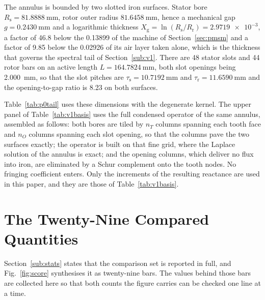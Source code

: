 \documentclass[10pt,a4paper,twocolumn]{article}
\newcommand{\Rs}{R_{\mathrm{s}}}
\newcommand{\Xg}{X_{\mathrm{g}}}
\theoremstyle{plain}
\theoremstyle{remark}
\begin{document}
The annulus is bounded by two slotted iron surfaces. Stator bore
$\Rs=\SI{81.8888}{\milli\metre}$, rotor outer radius
$\SI{81.6458}{\milli\metre}$, hence a mechanical gap
$g=\SI{0.2430}{\milli\metre}$ and a logarithmic thickness
$\Xg=\ln(\Rs/R_{\mathrm{r}})=\num{2.9719e-3}$, a factor of \num{46.8}
below the \num{0.13899} of the machine of Section~\ref{sec:pmsm} and a
factor of \num{9.85} below the \num{0.02926} of its air layer taken
alone, which is the thickness that governs the spectral tail of
Section~\ref{sub:v1}. There
are 48 stator slots and 44 rotor bars on an active length
$L=\SI{164.7824}{\milli\metre}$, both slot openings being
\SI{2.000}{\milli\metre}, so that the slot pitches are
$\tau_{\mathrm{s}}=\SI{10.7192}{\milli\metre}$ and
$\tau_{\mathrm{r}}=\SI{11.6590}{\milli\metre}$ and the opening-to-gap
ratio is \num{8.23} on both surfaces.

Table~\ref{tab:p0tail} uses these dimensions with the degenerate
kernel. The upper panel of Table~\ref{tab:v1basis} uses the full
condensed operator of the same annulus, assembled as follows: both bores
are tiled by $n_T$ columns spanning each tooth face and $n_O$ columns
spanning each slot opening, so that the columns pave the two surfaces
exactly; the operator is built on that fine grid, where the Laplace
solution of the annulus is exact; and the opening columns, which deliver
no flux into iron, are eliminated by a Schur complement onto the tooth
nodes. No fringing coefficient enters. Only the increments of the
resulting reactance are used in this paper, and they are those of
Table~\ref{tab:v1basis}.




\section{The Twenty-Nine Compared Quantities}
\label{app:scorecard}

Section~\ref{sub:stats} states that the comparison set is reported in
full, and Fig.~\ref{fig:score} synthesises it as twenty-nine bars. The
values behind those bars are collected here so that both counts the
figure carries can be checked one line at a time.
\end{document}
